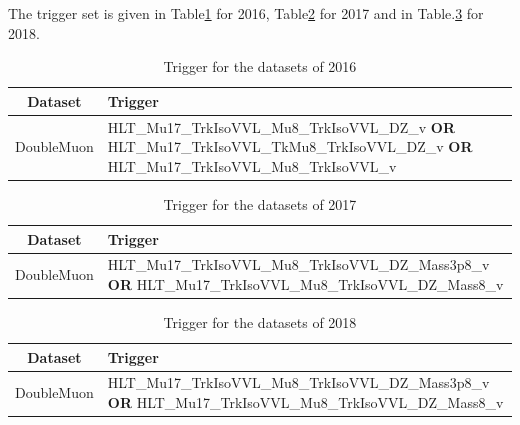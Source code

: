 \documentclass{cernatlasnote}
\begin{document}
The trigger set is given in Table\ref{tab:TRIGGER2016} for 2016, Table\ref{tab:TRIGGER2017} for 2017 and in Table.\ref{tab:TRIGGER2018} for 2018. 

\begin{table}[h]
\centering
\begin{tabular}{|c|p{12cm}|}
  \hline
  \rowcolor{lightgray} 
  Dataset & Trigger \\
  \hline
  DoubleMuon & HLT\_Mu17\_TrkIsoVVL\_Mu8\_TrkIsoVVL\_DZ\_v \textbf{OR} HLT\_Mu17\_TrkIsoVVL\_TkMu8\_TrkIsoVVL\_DZ\_v \textbf{OR} HLT\_Mu17\_TrkIsoVVL\_Mu8\_TrkIsoVVL\_v  \\
  \hline
\end{tabular}
    \caption{Trigger for the datasets of 2016}
    \label{tab:TRIGGER2016}
\end{table}

\begin{table}[h]
\centering
\begin{tabular}{|c|p{13 cm}|}
  \hline
  \rowcolor{lightgray} 
  Dataset & Trigger \\
  \hline
  DoubleMuon & HLT\_Mu17\_TrkIsoVVL\_Mu8\_TrkIsoVVL\_DZ\_Mass3p8\_v \textbf{OR} HLT\_Mu17\_TrkIsoVVL\_Mu8\_TrkIsoVVL\_DZ\_Mass8\_v \\
  \hline
\end{tabular}
    \caption{Trigger for the datasets of 2017}
    \label{tab:TRIGGER2017}
\end{table}



\begin{table}[h]
\centering
\begin{tabular}{|c|p{13 cm}|}
  \hline
  \rowcolor{lightgray} 
  Dataset & Trigger \\
  \hline
  DoubleMuon & HLT\_Mu17\_TrkIsoVVL\_Mu8\_TrkIsoVVL\_DZ\_Mass3p8\_v \textbf{OR} HLT\_Mu17\_TrkIsoVVL\_Mu8\_TrkIsoVVL\_DZ\_Mass8\_v\\
  \hline
\end{tabular}
    \caption{Trigger for the datasets of 2018}
    \label{tab:TRIGGER2018}
\end{table}
\end{document}
